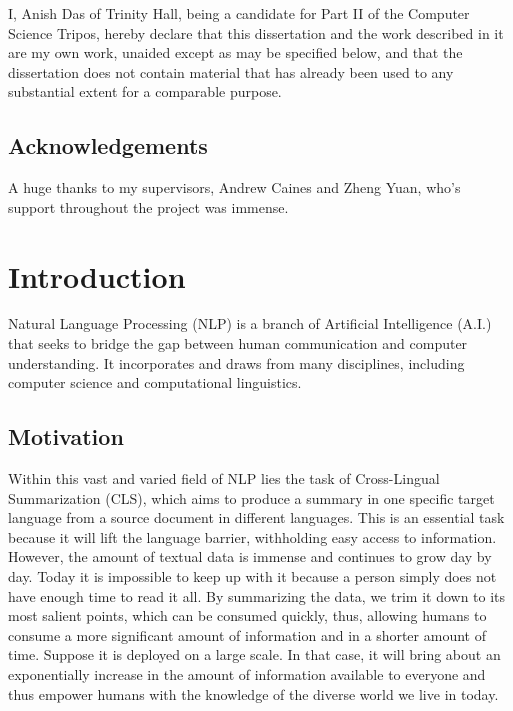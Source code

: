 \documentclass[12pt,a4paper,twoside,openright]{report}
\begin{document}
I, Anish Das of Trinity Hall, being a candidate for Part II of the Computer Science Tripos, hereby declare 
that this dissertation and the work described in it are my own work,
unaided except as may be specified below, and that the dissertation
does not contain material that has already been used to any substantial
extent for a comparable purpose.

\bigskip
{}

\medskip
{}

\bigskip
\section*{Acknowledgements}

A huge thanks to my supervisors, Andrew Caines and Zheng Yuan, who's support throughout the project was immense. 


\tableofcontents

\listoffigures
\listoftables




\pagestyle{headings}

\cleardoublepage{}

\chapter{Introduction}
\label{intro}


Natural Language Processing (NLP) is a branch of Artificial Intelligence (A.I.) that seeks to bridge the gap between human communication and computer understanding. It incorporates and draws from many disciplines, including computer science and computational linguistics.  

\section{Motivation}
\label{motivation}

Within this vast and varied field of NLP lies the task of Cross-Lingual Summarization (CLS), which aims to produce a summary in one specific target language from a source document in different languages. This is an essential task because it will lift the language barrier, withholding easy access to information. However, the amount of textual data is immense and continues to grow day by day. Today it is impossible to keep up with it because a person simply does not have enough time to read it all. By summarizing the data, we trim it down to its most salient points, which can be consumed quickly, thus, allowing humans to consume a more significant amount of information and in a shorter amount of time.  Suppose it is deployed on a large scale. In that case, it will bring about an exponentially increase in the amount of information available to everyone and thus empower humans with the knowledge of the diverse world we live in today. 
\end{document}
